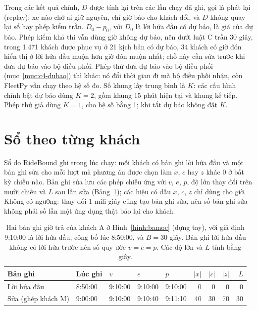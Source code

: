Trong các kết quả chính, $D$ được tính lại trên các lần chạy đã ghi, gọi là phát lại (replay): xe nào chở ai giữ
nguyên, chỉ giờ báo cho khách đổi, và $D$ không quay lại sổ hay phép kiểm trần. $D_0 - p_0$, với $D_0$ là lời hứa
đầu có dự báo, là giá của dự báo. Phép kiểm khả thi vẫn dùng giờ không dự báo, nên dưới luật C trần 30 giây, trong
1.471 khách được phục vụ ở 21 kịch bản có dự báo, 34 khách có giờ đón hiển thị ở lời hứa đầu muộn hơn giờ đón
muộn nhất; chỗ này cần sửa trước khi đưa dự báo vào bộ điều phối. Phép thử đưa dự báo vào bộ điều phối
(mục~\ref{muc:c4-dubao}) thì khác: nó đổi thời gian đi mà bộ điều phối nhận, còn FleetPy vẫn chạy theo hệ số đo.
Số khung lấy trung bình là $K$: các cấu hình chính bật dự báo dùng $K = 2$, gồm khung 15 phút hiện tại và khung kế tiếp.
Phép thử giả dùng $K = 1$, cho hệ số bằng 1; khi tắt dự báo không đặt $K$.

\section{Sổ theo từng khách}
\label{muc:so}

Sổ do RideBound ghi trong lúc chạy: mỗi khách có bản ghi lời hứa đầu và một bản ghi sửa cho mỗi lượt mà phương án
được chọn làm $x$, $c$ hay $z$ khác 0 ở bất kỳ chiều nào. Bản ghi sửa lưu các phép chiếu ứng với $v$, $e$, $p$,
độ lớn thay đổi trên mười chiều và $L$ sau lần sửa (Bảng~\ref{bang:vidu-so}); các hiệu có dấu $x$, $c$, $z$ chỉ dùng
cho giờ. Không có ngưỡng: thay đổi 1 mili giây cũng tạo bản ghi sửa, nên số bản ghi sửa không phải số lần một ứng
dụng thật báo lại cho khách.

\begin{table}[htbp]
\centering
\caption[Bản ghi sổ của khách A trong ví dụ dựng tay]{Hai bản ghi giờ trả của khách A ở Hình~\ref{hinh:bamoc} (dựng tay), với giả định 9:10:00 là lời hứa đầu,
công bố lúc 8:50:00, và $B = 30$ giây. Bản ghi lời hứa đầu không có lời hứa trước nên sổ quy ước $v = e = p$. Các
độ lớn và $L$ tính bằng giây.}
\label{bang:vidu-so}
\small
\begin{tabular}{@{}lllllrrrr@{}}
\toprule
\textbf{Bản ghi} & \textbf{Lúc ghi} & $v$ & $e$ & $p$ & $|x|$ & $|c|$ & $|z|$ & $L$\\
\midrule
Lời hứa đầu & 8:50:00 & 9:10:00 & 9:10:00 & 9:10:00 & 0 & 0 & 0 & 0\\
Sửa (ghép khách M) & 9:00:00 & 9:10:00 & 9:10:40 & 9:11:10 & 40 & 30 & 70 & 30\\
\bottomrule
\end{tabular}
\end{table}

